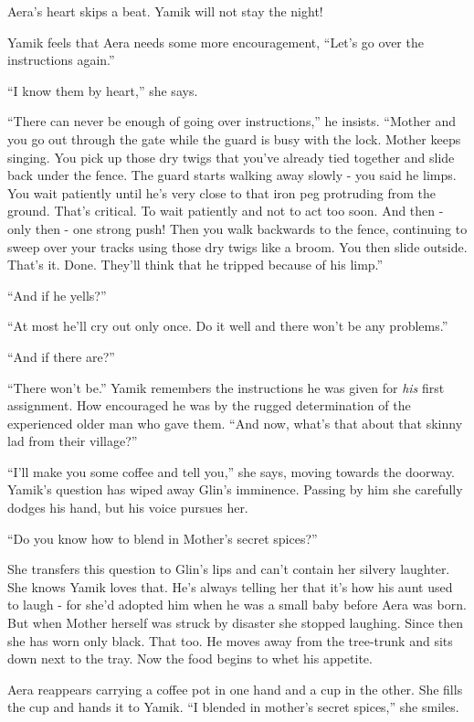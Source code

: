 \documentclass[twoside,11pt]{book}
\begin{document}
Aera's heart skips a beat. Yamik will not stay the night!

Yamik feels that Aera needs some more encouragement, ``Let's go over the instructions again.''

``I know them by heart,'' she says.

``There can never be enough of going over instructions,'' he insists. ``Mother and you go
out through the gate while the guard is busy with the lock. Mother keeps singing. You pick up those dry twigs that
you've already tied together and slide back under the fence. The guard starts walking away slowly
- you said he limps. You wait patiently until he's very close to that iron
peg protruding from the ground. That's critical. To wait patiently and not to act too soon. And then - only then -
one strong push! Then you walk backwards to the fence, continuing to sweep over your tracks using those dry
twigs like a broom. You then slide outside. That's it. Done. They'll think
that he tripped because of his limp.''

``And if he yells?''

``At most he'll cry out only once. Do it well and there won't be any problems.''

``And if there are?''

``There won't be.'' Yamik remembers the instructions he was given for \textit{his} first assignment. How
encouraged he was by the rugged determination of the experienced older man who gave them. ``And now, what's that about
that skinny lad from their village?''

``I'll make you some coffee and tell you,'' she says, moving towards the doorway. Yamik's question has wiped away
Glin's imminence. Passing by him she carefully dodges his hand, but his voice pursues her.

``Do you know how to blend in Mother's secret spices?''

She transfers this question to Glin's lips and can't contain her silvery laughter. She knows Yamik loves that. He's
always telling her that it's how his aunt used to laugh - for she'd adopted him when he was a small baby before Aera
was born. But when Mother herself was struck by disaster she stopped laughing. Since then she has worn only black. That
too. He moves away from the tree-trunk and sits down next to the tray. Now the food begins to whet his appetite.

Aera reappears carrying a coffee pot in one hand and a cup in the other. She fills the cup and hands it to Yamik. ``I
blended in mother's secret spices,'' she smiles. 
\end{document}

